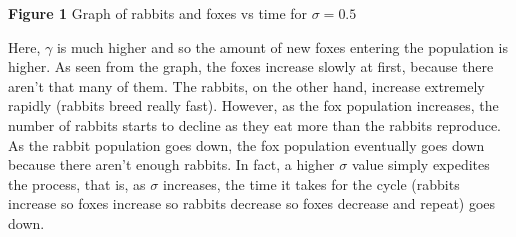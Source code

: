 \documentclass{article}
\begin{document}
\textbf{Figure 1} Graph of rabbits and foxes vs time for $\sigma = 0.5$ 
\vspace{1cm}

Here, $\gamma$ is much higher and so the amount of new foxes entering the population is higher. As seen from the graph, the foxes increase slowly at first, because there aren't that many of them. The rabbits, on the other hand, increase extremely rapidly (rabbits breed really fast). However, as the fox population increases, the number of rabbits starts to decline as they eat more than the rabbits reproduce. As the rabbit population goes down, the fox population eventually goes down because there aren't enough rabbits. In fact, a higher $\sigma$ value simply expedites the process, that is, as $\sigma$ increases, the time it takes for the cycle (rabbits increase so foxes increase so rabbits decrease so foxes decrease and repeat) goes down.
\end{document}
